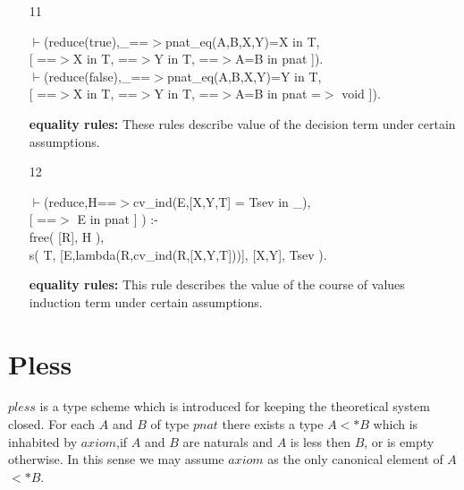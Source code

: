 \documentclass[11pt]{report}
\newcommand{\inv}[1]{\index{#1}}
\begin{document}
\begin{enumerate}
 {\bf membership rule:}
 The decision operator yields a value of the type $T$, provided
 both the \emph{then} and the \emph{else} part of the decision
 operator are elements of $T$.
 
 \item[11]
\begin{sf}\begin{tabbing}
$\vdash$(reduce(true),\_\hspace{0.1em}==$>$pnat\_\hspace{0.1em}eq(A,B,X,Y)=X in T, \\[-0.15ex]
\hspace{2em}[  ==$>$X in T, ==$>$Y in T,  ==$>$A=B in pnat ]).\\[-0.15ex]
$\vdash$(reduce(false),\_\hspace{0.1em}==$>$pnat\_\hspace{0.1em}eq(A,B,X,Y)=Y in T, \\[-0.15ex]
\hspace{2em}[  ==$>$X in T, ==$>$Y in T, ==$>$A=B in pnat =$>$ void ]).
\end{tabbing}\end{sf}

 {\bf equality rules:}      
 These rules describe value of the decision term under certain
 assumptions. 
 \item[12]
\begin{sf}\begin{tabbing}
$\vdash$(reduce,H==$>$cv\_\hspace{0.1em}ind(E,[X,Y,T] = Tsev in \_\hspace{0.1em}),\\[-0.15ex]
\hspace{2em}[ ==$>$ E in pnat ] ) :-\\[-0.15ex]
\hspace{2em}free( [R], H ),\\[-0.15ex]
\hspace{2em}s( T, [E,lambda(R,cv\_\hspace{0.1em}ind(R,[X,Y,T]))], [X,Y], Tsev ).
\end{tabbing}\end{sf}

 {\bf equality rules:}      
 This rule describes the value of the course of values induction
 term under certain assumptions. 
  
 \end{enumerate}
 \section{Pless}
 \inv{pless type scheme}
 $pless$ is a type scheme which is introduced for keeping the
 theoretical system closed. For each $A$ and $B$ of type
 $pnat$ there exists a type $A$$<*$$B$ which is inhabited 
 by $axiom$,if $A$ and $B$ are naturals and $A$ is less then $B$,
 or is empty otherwise. In this sense
 we may assume $axiom$ as the only canonical element of $A$$<*$$B$.
  
\end{document}
